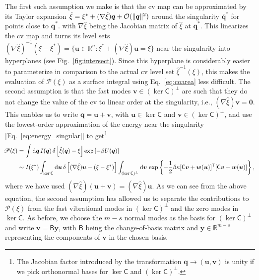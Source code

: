 The first such assumption we make is that the \ac{cv} map can be approximated by its Taylor expansion $\hat{\xi} = \xi^{*} + (\nabla\hat{\xi})\bm{q} + \mathcal{O}(\lVert\bm{q}\rVert^2)$ around the singularity $\bar{\bm{q}}^{*}$ for points close to $\bar{\bm{q}}^{*}$.
with $\nabla\hat{\xi}$ being the Jacobian matrix of $\hat{\xi}$ at $\bar{\bm{q}}^{*}$.
This linearizes the \ac{cv} map and turns its level sets $(\nabla\hat{\xi})^{-1}(\xi - \xi^{*}) = \{\bm{u} \in \mathbb{R}^{n}: \xi^{*} + (\nabla\hat{\xi})\bm{u} = \xi\}$ near the singularity into hyperplanes (see Fig.~\ref{fig:intersect}).
Since this hyperplane is considerably easier to parameterize in comparison to the actual \ac{cv} level set $\hat{\xi}^{-1}(\xi)$, this makes the evaluation of $\mathscr{P}(\xi)$ as a surface integral using Eq.~\eqref{eq:coarea} less difficult.
The second assumption is that the fast modes $\bm{v} \in (\ker\mathsf{C})^{\perp}$ are such that they do not change the value of the \ac{cv} to linear order at the singularity, i.e., $(\nabla\hat{\xi})\bm{v} = \bm{0}$.
This enables us to write $\bm{q} = \bm{u} + \bm{v}$, with $\bm{u} \in \ker\mathsf{C}$ and $\bm{v} \in (\ker\mathsf{C})^\perp$, and use the lowest-order approximation of the energy near the singularity [Eq.~\eqref{eq:energy_singular}] to get\footnote{The Jacobian factor introduced by the transformation $\bm{q} \to (\bm{u}, \bm{v})$ is unity if we pick orthonormal bases for $\ker\mathsf{C}$ and $(\ker\mathsf{C})^{\perp}$.}
%
\begin{equation}
  \hspace{-0.5em}
  \begin{aligned}
    \mathscr{P}(\xi) &= \int \mathrm{d}\bm{q}\, I(\bm{q})\,\delta\left[\hat{\xi}(\bm{q}) - \xi\right] \exp\left[-\beta U(\bm{q})\right]\\
                                 &\sim I(\xi^{*}) \int_{\ker\mathsf{C}} \mathrm{d}\bm{u}\, \delta\left[(\nabla\hat{\xi})\bm{u} - (\xi - \xi^{*})\right] \int_{(\ker\mathsf{C})^{\perp}} \mathrm{d}\bm{v}\,  \exp\left\{-\frac{1}{2}\beta\kappa[\mathsf{C}\bm{v} + \bm{w}(\bm{u})]^\mathsf{T}[\mathsf{C}\bm{v} + \bm{w}(\bm{u})]\right\},
  \end{aligned}
\end{equation}
%
where we have used $(\nabla\hat{\xi})(\bm{u} + \bm{v}) = (\nabla\hat{\xi})\bm{u}$.
As we can see from the above equation, the second assumption has allowed us to separate the contributions to $\mathscr{P}(\xi)$ from the fast vibrational modes in $(\ker\mathsf{C})^{\perp}$ and the zero modes in $\ker\mathsf{C}$.
As before, we choose the $m - s$ normal modes as the basis for $(\ker\mathsf{C})^{\perp}$ and write $\bm{v} = \mathsf{B}\bm{y}$, with $\mathsf{B}$ being the change-of-basis matrix and $\bm{y} \in \mathbb{R}^{m-s}$ representing the components of $\bm{v}$ in the chosen basis.
